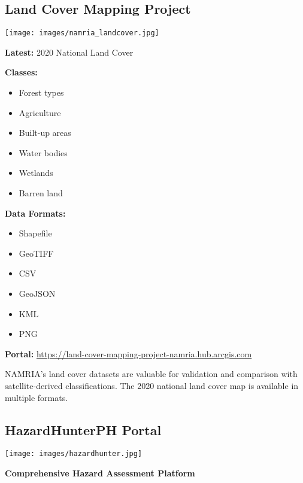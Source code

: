 \documentclass[
  letterpaper,
  DIV=11,
  numbers=noendperiod]{scrartcl}
\providecommand{\tightlist}{%
  \setlength{\itemsep}{0pt}\setlength{\parskip}{0pt}}
\begin{document}
\subsection{Land Cover Mapping
Project}\label{land-cover-mapping-project}

\begin{center}
\texttt{[image: images/namria\_landcover.jpg]}
\end{center}

\textbf{Latest:} 2020 National Land Cover

\textbf{Classes:}

\begin{itemize}
\tightlist
\item
  Forest types
\item
  Agriculture
\item
  Built-up areas
\item
  Water bodies
\item
  Wetlands
\item
  Barren land
\end{itemize}

\textbf{Data Formats:}

\begin{itemize}
\tightlist
\item
  Shapefile
\item
  GeoTIFF
\item
  CSV
\item
  GeoJSON
\item
  KML
\item
  PNG
\end{itemize}

\textbf{Portal:}
\url{https://land-cover-mapping-project-namria.hub.arcgis.com}

NAMRIA's land cover datasets are valuable for validation and comparison
with satellite-derived classifications. The 2020 national land cover map
is available in multiple formats.

\subsection{HazardHunterPH Portal}\label{hazardhunterph-portal}

\begin{center}
\texttt{[image: images/hazardhunter.jpg]}
\end{center}

\textbf{Comprehensive Hazard Assessment Platform}
\end{document}
